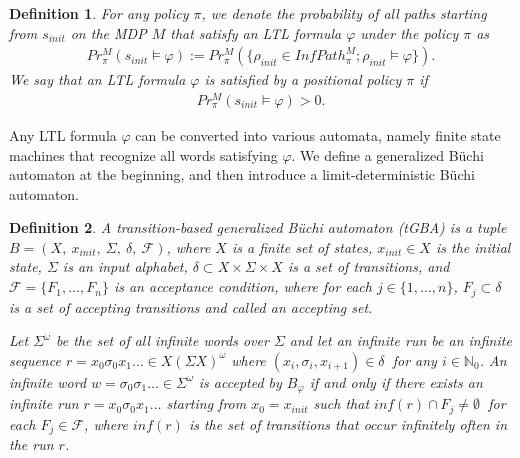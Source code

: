 \documentclass[letterpaper, 10 pt, conference]{ieeeconf}  %
\newtheorem{definition}{Definition}
\begin{document}
\begin{definition}
For any policy $\pi$, we denote the probability of all paths starting from $s_{init}$ on the MDP $M$ that satisfy an LTL formula $\varphi$ under the policy $\pi$ as
\begin{align*}
Pr^{M}_{\pi}(s_{init} \! \models \varphi) := Pr^{M}_{\pi}(\{ \rho_{init} \! \in \! InfPath^{M}_{\pi} ; \rho_{init} \! \models \varphi \}).
\end{align*}
We say that an LTL formula $\varphi$ is satisfied by a positional policy $\pi$ if
\begin{align*}
Pr^{M}_{\pi}(s_{init} \models \varphi) > 0.
\end{align*}



\label{def5}
\end{definition}

Any LTL formula $\varphi$ can be converted into various automata, namely finite state machines that recognize %
all words satisfying $\varphi$.
 We define a generalized B\"{u}chi automaton at the beginning, and then introduce a limit-deterministic B\"{u}chi automaton.

\begin{definition}
  A transition-based generalized B\"{u}chi automaton (tGBA) is a tuple $B = (X,\ x_{init},\ \Sigma,\ \delta,\ \mathcal{F})$, where $X$ is a finite set of states, $x_{init} \in X$ is the initial state, $\Sigma$ is an input alphabet, $\delta \subset  X\times \Sigma \times X$ is a set of transitions, and $\mathcal{F} = \{F_1,\ldots,F_n\}$ is an acceptance condition, where for each $ j \in \{1,\ldots,n\}$, $F_j \subset \delta$ is a set of accepting transitions and called an accepting set.

  Let $\Sigma^{\omega}$ be the set of all infinite words over $\Sigma$ and let an infinite run be an infinite sequence $r = x_0\sigma_0x_1 \ldots \in X (\Sigma X)^{\omega}$ where $(x_i, \sigma_{i}, x_{i+1}) \in \delta\ $ for any $ i\in \mathbb{N}_0$. An infinite word $w = \sigma_0\sigma_1 \ldots \in \Sigma^{\omega}$ is accepted by $B_{\varphi}$ if and only if there exists an infinite run $r = x_0 \sigma_0 x_1 \ldots$ starting from $x_0 = x_{init}$ such that $inf(r) \cap F_j \neq \emptyset\ $ for each $F_j \in \mathcal{F}$, where $inf(r)$ is the set of transitions that occur infinitely often in the run $r$.
\end{definition}
\end{document}
